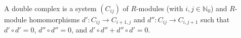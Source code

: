 A double complex is a system $(C_{ij})$ of $R$-modules (with $i, j \in \mathbb{N}_0$) and $R$-module homomorphisms $d': C_{ij} \to C_{i+1,j}$ and $d'': C_{ij} \to C_{i,j+1}$ such that $d' \circ d' = 0$, $d'' \circ d'' = 0$, and $d' \circ d'' + d'' \circ d' = 0$.
